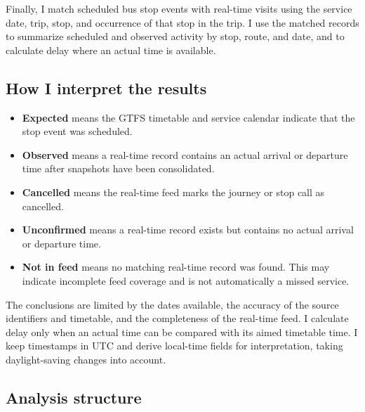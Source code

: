 \documentclass[11pt]{article}
\providecommand{\tightlist}{%
      \setlength{\itemsep}{0pt}\setlength{\parskip}{0pt}}
\begin{document}
Finally, I match scheduled bus stop events with real-time visits using
the service date, trip, stop, and occurrence of that stop in the trip. I
use the matched records to summarize scheduled and observed activity by
stop, route, and date, and to calculate delay where an actual time is
available.

\subsection{How I interpret the
results}\label{how-i-interpret-the-results}

\begin{itemize}
\tightlist
\item
  \textbf{Expected} means the GTFS timetable and service calendar
  indicate that the stop event was scheduled.
\item
  \textbf{Observed} means a real-time record contains an actual arrival
  or departure time after snapshots have been consolidated.
\item
  \textbf{Cancelled} means the real-time feed marks the journey or stop
  call as cancelled.
\item
  \textbf{Unconfirmed} means a real-time record exists but contains no
  actual arrival or departure time.
\item
  \textbf{Not in feed} means no matching real-time record was found.
  This may indicate incomplete feed coverage and is not automatically a
  missed service.
\end{itemize}

The conclusions are limited by the dates available, the accuracy of the
source identifiers and timetable, and the completeness of the real-time
feed. I calculate delay only when an actual time can be compared with
its aimed timetable time. I keep timestamps in UTC and derive local-time
fields for interpretation, taking daylight-saving changes into account.

\subsection{Analysis structure}\label{analysis-structure}
\end{document}
